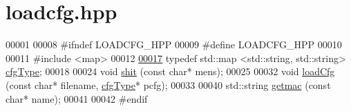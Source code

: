 \hypertarget{loadcfg_8hpp_source}{}\section{loadcfg.\+hpp}
\label{loadcfg_8hpp_source}

\begin{DoxyCode}
00001 
00008 \textcolor{preprocessor}{#ifndef LOADCFG\_HPP}
00009 \textcolor{preprocessor}{#define LOADCFG\_HPP}
00010 
00011 \textcolor{preprocessor}{#include <map>}
00012 
\hyperlink{loadcfg_8hpp_a3bc0e674227412446fc364a733cebde6}{00017} \textcolor{keyword}{typedef}  std::map <std::string, std::string> \hyperlink{loadcfg_8hpp_a3bc0e674227412446fc364a733cebde6}{cfgType};
00018 
00024 \textcolor{keywordtype}{void} \hyperlink{loadcfg_8hpp_a91f772c379dc1d6c6088d077aa722574}{shit} (\textcolor{keyword}{const} \textcolor{keywordtype}{char}* mens);
00025 
00032 \textcolor{keywordtype}{void} \hyperlink{loadcfg_8hpp_a4667fdb45ba6b04ab678f894e58a2fcb}{loadCfg} (\textcolor{keyword}{const} \textcolor{keywordtype}{char}* filename, \hyperlink{loadcfg_8hpp_a3bc0e674227412446fc364a733cebde6}{cfgType}* pcfg);
00033 
00040 std::string \hyperlink{loadcfg_8hpp_ae4db05d33445e6b6ca0c4a6a0ba23bf3}{getmac} (\textcolor{keyword}{const} \textcolor{keywordtype}{char}* name);
00041 
00042 \textcolor{preprocessor}{#endif}
\end{DoxyCode}
